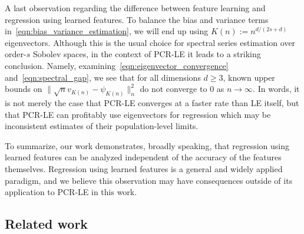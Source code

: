 A last observation regarding the difference between feature learning and regression using learned features. To balance the bias and variance terms in~\eqref{eqn:bias_variance_estimation}, we will end up using $K(n) := n^{d/(2s + d)}$ eigenvectors. Although this is the usual choice for spectral series estimation over order-$s$ Sobolev spaces, in the context of PCR-LE it leads to a striking conclusion. Namely, examining~\eqref{eqn:eigenvector_convergence} and~\eqref{eqn:spectral_gap}, we see that for all dimensions $d \geq 3$, known upper bounds on $\|\sqrt{n} v_{K(n)} - \psi_{K(n)}\|_n^2$ do not converge to $0$ as $n \to \infty$. In words, it is not merely the case that PCR-LE converges at a faster rate than LE itself, but that PCR-LE can profitably use eigenvectors for regression which may be inconsistent estimates of their population-level limits. 

To summarize, our work demonstrates, broadly speaking, that regression using learned features can be analyzed independent of the accuracy of the features themselves. Regression using learned features is a general and widely applied paradigm, and we believe this observation may have consequences outside of its application to PCR-LE in this work.

\subsection{Related work}

